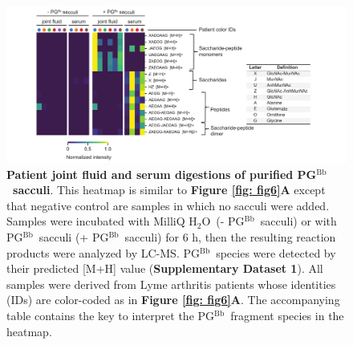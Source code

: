 \documentclass[twoside, watermark]{zHenriquesLab-StyleBioRxiv}
\newcommand{\HtwoO}{H$_\text{2}$O} %
\newcommand{\pgbb}{PG$^\text{Bb}$}
\begin{document}
\pagebreak
\begin{figure}[ht!]
    \centering
    \includegraphics[width = \textwidth]{Figures/Figure_S12_PG_degradation_without_sacculi.pdf}
    \caption{\textbf{Patient joint fluid and serum digestions of purified \pgbb~sacculi}. This heatmap is similar to \textbf{Figure \ref{fig: fig6}A} except that negative control are samples in which no sacculi were added. Samples were incubated with MilliQ \HtwoO~(- \pgbb~sacculi) or with \pgbb~sacculi (+ \pgbb~sacculi) for 6 h, then the resulting reaction products were analyzed by LC-MS. \pgbb~species were detected by their predicted [M+H] value (\textbf{Supplementary Dataset 1}). All samples were derived from Lyme arthritis patients whose identities (IDs) are color-coded as in \textbf{Figure \ref{fig: fig6}A}. The accompanying table contains the key to interpret the \pgbb~fragment species in the heatmap.}
    \label{fig: figS12}
\end{figure}

\pagebreak

\end{document}
